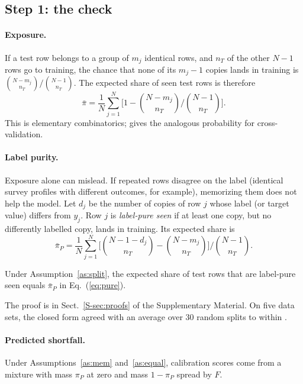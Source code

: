 \subsection{Step 1: the check}\label{sec:check}
\paragraph{Exposure.} If a test row belongs to a group of $m_j$ identical rows, and $n_T$ of the other $N-1$ rows go to training, the chance that none of its $m_j-1$ copies lands in training is $\binom{N-m_j}{n_T}/\binom{N-1}{n_T}$. The expected share of seen test rows is therefore
\begin{equation}
\bar\pi=\frac1N\sum_{j=1}^{N}\Big[1-\binom{N-m_j}{n_T}\Big/\binom{N-1}{n_T}\Big].\label{eq:exposure}
\end{equation}
This is elementary combinatorics; \citet{li2026} gives the analogous probability for cross-validation.

\paragraph{Label purity.} Exposure alone can mislead. If repeated rows disagree on the label (identical survey profiles with different outcomes, for example), memorizing them does not help the model. Let $d_j$ be the number of copies of row $j$ whose label (or target value) differs from $y_j$. Row $j$ is \emph{label-pure seen} if at least one copy, but no differently labelled copy, lands in training. Its expected share is
\begin{equation}
\bar\pi_P=\frac1N\sum_{j=1}^{N}\Big[\binom{N-1-d_j}{n_T}-\binom{N-m_j}{n_T}\Big]\Big/\binom{N-1}{n_T}.\label{eq:pure}
\end{equation}

\begin{proposition}\label{prop:pure}
Under Assumption~\ref{as:split}, the expected share of test rows that are label-pure seen equals $\bar\pi_P$ in Eq.~(\ref{eq:pure}).
\end{proposition}
The proof is in Sect.~\ref{S-sec:proofs} of the Supplementary Material. On five data sets, the closed form agreed with an average over 30 random splits to within \NPureCfMaxdiff{}.

\paragraph{Predicted shortfall.} Under Assumptions~\ref{as:mem} and~\ref{as:equal}, calibration scores come from a mixture with mass $\pi_P$ at zero and mass $1-\pi_P$ spread by $F$.

